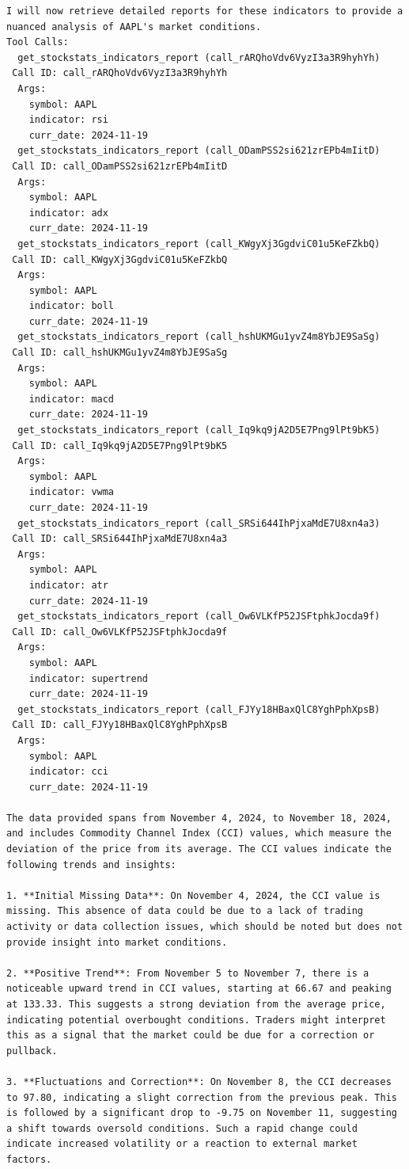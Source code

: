 \begin{tcolorbox}
\begin{lstlisting}[style=agentbase]
I will now retrieve detailed reports for these indicators to provide a nuanced analysis of AAPL's market conditions.
Tool Calls:
  get_stockstats_indicators_report (call_rARQhoVdv6VyzI3a3R9hyhYh)
 Call ID: call_rARQhoVdv6VyzI3a3R9hyhYh
  Args:
    symbol: AAPL
    indicator: rsi
    curr_date: 2024-11-19
  get_stockstats_indicators_report (call_ODamPSS2si621zrEPb4mIitD)
 Call ID: call_ODamPSS2si621zrEPb4mIitD
  Args:
    symbol: AAPL
    indicator: adx
    curr_date: 2024-11-19
  get_stockstats_indicators_report (call_KWgyXj3GgdviC01u5KeFZkbQ)
 Call ID: call_KWgyXj3GgdviC01u5KeFZkbQ
  Args:
    symbol: AAPL
    indicator: boll
    curr_date: 2024-11-19
  get_stockstats_indicators_report (call_hshUKMGu1yvZ4m8YbJE9SaSg)
 Call ID: call_hshUKMGu1yvZ4m8YbJE9SaSg
  Args:
    symbol: AAPL
    indicator: macd
    curr_date: 2024-11-19
  get_stockstats_indicators_report (call_Iq9kq9jA2D5E7Png9lPt9bK5)
 Call ID: call_Iq9kq9jA2D5E7Png9lPt9bK5
  Args:
    symbol: AAPL
    indicator: vwma
    curr_date: 2024-11-19
  get_stockstats_indicators_report (call_SRSi644IhPjxaMdE7U8xn4a3)
 Call ID: call_SRSi644IhPjxaMdE7U8xn4a3
  Args:
    symbol: AAPL
    indicator: atr
    curr_date: 2024-11-19
  get_stockstats_indicators_report (call_Ow6VLKfP52JSFtphkJocda9f)
 Call ID: call_Ow6VLKfP52JSFtphkJocda9f
  Args:
    symbol: AAPL
    indicator: supertrend
    curr_date: 2024-11-19
  get_stockstats_indicators_report (call_FJYy18HBaxQlC8YghPphXpsB)
 Call ID: call_FJYy18HBaxQlC8YghPphXpsB
  Args:
    symbol: AAPL
    indicator: cci
    curr_date: 2024-11-19

The data provided spans from November 4, 2024, to November 18, 2024, and includes Commodity Channel Index (CCI) values, which measure the deviation of the price from its average. The CCI values indicate the following trends and insights:

1. **Initial Missing Data**: On November 4, 2024, the CCI value is missing. This absence of data could be due to a lack of trading activity or data collection issues, which should be noted but does not provide insight into market conditions.

2. **Positive Trend**: From November 5 to November 7, there is a noticeable upward trend in CCI values, starting at 66.67 and peaking at 133.33. This suggests a strong deviation from the average price, indicating potential overbought conditions. Traders might interpret this as a signal that the market could be due for a correction or pullback.

3. **Fluctuations and Correction**: On November 8, the CCI decreases to 97.80, indicating a slight correction from the previous peak. This is followed by a significant drop to -9.75 on November 11, suggesting a shift towards oversold conditions. Such a rapid change could indicate increased volatility or a reaction to external market factors.


\end{lstlisting}
\end{tcolorbox}
